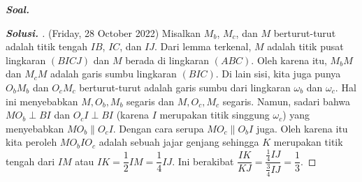 \textbf{\textit{Soal. }}

\begin{proof}[\textbf{Solusi. }] (Friday, 28 October 2022) Misalkan $M_b$, $M_c$, dan $M$ berturut-turut adalah titik tengah $IB$, $IC$, dan $IJ$. Dari lemma terkenal, $M$ adalah titik pusat lingkaran $(BICJ)$ dan $M$ berada di lingkaran $(ABC)$. Oleh karena itu, $M_bM$ dan $M_cM$ adalah garis sumbu lingkaran $(BIC)$. Di lain sisi, kita juga punya $O_bM_b$ dan $O_cM_c$ berturut-turut adalah garis sumbu dari lingkaran $\omega_b$ dan $\omega_c$. Hal ini menyebabkan $M, O_b, M_b$ segaris dan $M, O_c, M_c$ segaris. Namun, sadari bahwa $MO_b \perp BI$ dan $O_cI \perp BI$ (karena $I$ merupakan titik singgung $\omega_c$) yang menyebabkan $MO_b \parallel O_cI$. Dengan cara serupa $MO_c \parallel O_bI$ juga. Oleh karena itu kita peroleh $MO_bIO_c$ adalah sebuah jajar genjang sehingga $K$ merupakan titik tengah dari $IM$ atau $IK = \dfrac{1}{2}IM = \dfrac{1}{4}IJ$. Ini berakibat $\dfrac{IK}{KJ} = \dfrac{\frac{1}{4}IJ}{\frac{3}{4}IJ}=\boxed{\dfrac{1}{3}}$.
% 

\end{proof}